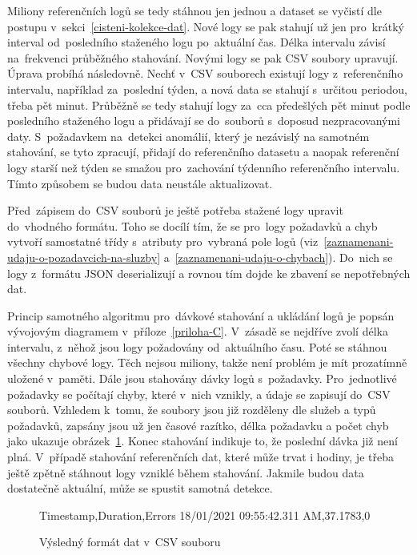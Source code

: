 Miliony referenčních logů se tedy stáhnou jen jednou a dataset se vyčistí dle postupu v~sekci~\ref{cisteni-kolekce-dat}. Nové logy se pak stahují už jen pro~krátký interval od~posledního staženého logu po~aktuální čas. Délka intervalu závisí na~frekvenci průběžného stahování. Novými logy se pak CSV soubory upravují. Úprava probíhá následovně. Nechť v~CSV souborech existují logy z~referenčního intervalu, například za~poslední týden, a nová data se stahují s~určitou periodou, třeba pět minut. Průběžně se tedy stahují logy za~cca předešlých pět minut podle posledního staženého logu a přidávají se do~souborů s~doposud nezpracovanými daty. S~požadavkem na~detekci anomálií, který je nezávislý na samotném stahování, se tyto zpracují, přidají do referenčního datasetu a naopak referenční logy starší než týden se smažou pro~zachování týdenního referenčního intervalu. Tímto způsobem se budou data neustále aktualizovat.

Před~zápisem do~CSV souborů je ještě potřeba stažené logy upravit do~vhodného formátu. Toho se docílí tím, že se pro~logy požadavků a chyb vytvoří samostatné třídy s~atributy pro~vybraná pole logů (viz~\ref{zaznamenani-udaju-o-pozadavcich-na-sluzby} a~\ref{zaznamenani-udaju-o-chybach}). Do~nich se logy z~formátu JSON deserializují a rovnou tím dojde ke zbavení se nepotřebných dat.

Princip samotného algoritmu pro~dávkové stahování a ukládání logů je popsán vývojovým diagramem v~příloze~\ref{priloha-C}. V~zásadě se nejdříve zvolí délka intervalu, z~něhož jsou logy požadovány od~aktuálního času. Poté se stáhnou všechny chybové logy. Těch nejsou miliony, takže není problém je mít prozatímně uložené v~paměti. Dále jsou stahovány dávky logů s~požadavky. Pro~jednotlivé požadavky se počítají chyby, které v~nich vznikly, a údaje se zapisují do~CSV souborů. Vzhledem k~tomu, že soubory jsou již rozděleny dle služeb a typů požadavků, zapsány jsou už jen časové razítko, délka požadavku a počet chyb jako ukazuje obrázek~\ref{csv-format-img}. Konec stahování indikuje to, že poslední dávka již není plná. V~případě stahování referenčních dat, které může trvat i hodiny, je třeba ještě zpětně stáhnout logy vzniklé během stahování. Jakmile budou data dostatečně aktuální, může se spustit samotná detekce.

\begin{figure}[hbt]
	\centering
	\begin{boxedverbatim}
Timestamp,Duration,Errors
18/01/2021 09:55:42.311 AM,37.1783,0
	\end{boxedverbatim}
	\caption{Výsledný formát dat v~CSV souboru}
	\label{csv-format-img}
\end{figure}


